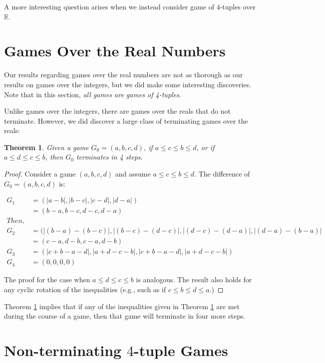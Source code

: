 \documentclass[12pt]{amsart}
\newtheorem{theorem}{Theorem}[section]
\begin{document}
A more interesting question arises when we instead consider game of $4$-tuples over $\mathbb{R}$.

\section{Games Over the Real Numbers}

Our results regarding games over the real numbers are not as thorough as our results on games over the integers, but we did make some interesting discoveries. Note that in this section, \emph{all games are games of 4-tuples}.

Unlike games over the integers, there are games over the reals that do not terminate. However, we did discover a large class of terminating games over the reals:

\begin {theorem}
\label{thm:inequalities}
Given a game $G_0 =  (a, b, c, d)$, if $a \leq c \leq b \leq d$, or if $a \leq d \leq c \leq b$, then $G_0$ terminates in 4 steps. 
\end{theorem}

\begin{proof}
Consider a game $(a,b,c,d)$ and assume $a \leq c \leq b \leq d$. The difference of $G_0 =  (a, b, c, d)$ is:

\begin{align*}
G_1 &= (|a-b|, |b-c|, |c-d|, |d-a|) \\
&=(b-a, b-c, d-c, d-a)\\
Then, \\
G_2 &= (|(b-a) - (b-c)|, |(b-c) - (d-c)|, |(d-c) - (d-a)|, |(d-a) - (b-a)| \\
&= (c-a, d-b, c-a, d-b)\\
G_3 &= (|c + b - a - d|, |a + d - c - b|, |c + b - a - d|, |a + d - c - b|)\\
G_4 &= (0,0,0,0)
\end{align*}

The proof for the case when $a \leq d \leq c \leq b$ is analogous. The result also holds for any cyclic rotation of the inequalities (e.g., such as if $c \leq b \leq d \leq a$.)
\end{proof}

Theorem \ref{thm:inequalities} implies that if any of the inequalities given in Theorem \ref{thm:inequalities} are met during the course of a game, then that game will terminate in four more steps.

\section{Non-terminating $4$-tuple Games\label{sec:nonterminating}}
\end{document}
